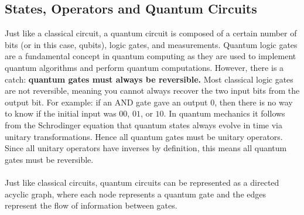 \documentclass{article}[11pt]
\begin{document}
\subsection{States, Operators and Quantum Circuits}
Just like a classical circuit, a quantum circuit is composed of a certain number of bits (or in this case, qubits), logic gates, and measurements. Quantum logic gates are a fundamental concept in quantum computing as they are used to implement quantum algorithms and perform quantum computations. However, there is a catch: \textbf{quantum gates must always be reversible.}\cite{nielsenChuang} Most classical logic gates are not reversible, meaning you cannot always recover the two input bits from the output bit. For example: if an AND gate gave an output $0$, then there is no way to know if the initial input was $00$, $01$, or $10$. In quantum mechanics it follows from the Schrodinger equation that quantum states always evolve in time via unitary transformations.\cite{griffiths} Hence all quantum gates must be unitary operators. Since all unitary operators have inverses by definition, this means all quantum gates must be reversible.\\
\\
Just like classical circuits, quantum circuits can be represented as a directed acyclic graph, where each node represents a quantum gate and the edges represent the flow of information between gates.
\end{document}
